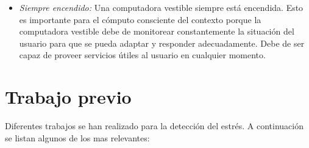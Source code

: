 \documentclass[letterpaper,12pt]{cicese}
\begin{document}
				\begin{itemize}
					\item{\emph{Siempre encendido:}} Una computadora vestible siempre est\'a encendida. Esto es importante para el c\'omputo consciente del contexto
					porque la computadora vestible debe de monitorear constantemente la situaci\'on del usuario para que se pueda adaptar y responder
					adecuadamente. Debe de ser capaz de proveer servicios \'utiles al usuario en cualquier momento.
				\end{itemize}

		\chapter{Trabajo previo}
				Diferentes trabajos se han realizado para la detecci\'on del estr\'es. A continuaci\'on se listan algunos de los mas relevantes:
\end{document}
